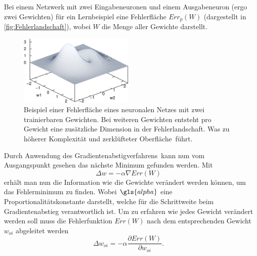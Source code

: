Bei einem Netzwerk mit zwei Eingabeneuronen und einem Ausgabeneuron (ergo zwei Gewichten) für ein Lernbeispiel eine Fehlerfläche $Err_p(W)$ (dargestellt in \autoref{fig:Fehlerlandschaft}), wobei $W$ die Menge aller Gewichte darstellt.

\begin{figure}[tb]
    \centering
        \includegraphics[width=0.5\textwidth]{Bilder/misc/Fehlerlandschaft.png}
    \caption[Beispiel einer Fehlerfläche eines künstlichen neuronalen Netzes]{Beispiel einer Fehlerfläche eines neuronalen Netzes mit zwei trainierbaren Gewichten. Bei weiteren Gewichten entsteht pro Gewicht eine zusätzliche Dimension in der Fehlerlandschaft. Was zu höherer Komplexität und zerklüfteter \glqq Oberfläche\grqq~führt.\protect\footnotemark{}}
    \label{fig:Fehlerlandschaft}
\end{figure}
\addtocounter{footnote}{-1}     %
\addtocounter{Hfootnote}{-1}    %
\wrapfigfoot{}

Durch Anwendung des Gradientenabstigverfahrens\, kann nun vom Ausgangspunkt gesehen das nächste Minimum gefunden werden. Mit
\begin{equation}
\Delta w = - \alpha \nabla Err(W)
\end{equation}
erhält man nun die Information wie die Gewichte verändert werden können, um das Fehlerminimum zu finden.
Wobei $\gls{alpha}$ eine Proportionalitätskonstante darstellt, welche für die Schrittweite beim Gradientenabstieg verantwortlich ist.
Um zu erfahren wie jedes Gewicht verändert werden soll muss die Fehlerfunktion $Err(W)$ nach dem entsprechenden Gewicht $w_{oi}$ abgeleitet werden
\begin{equation}
\Delta w_{oi} = - \alpha \frac{\partial Err(W)}{\partial w_{oi}} .
\label{gl:gewaend}
\end{equation}

